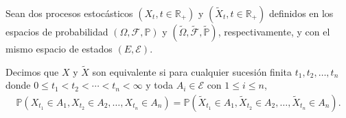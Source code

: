 \begin{definition}
Sean dos procesos estocásticos $(X_t, t \in \mathbb{R}_{+})$ y $(\tilde{X}_t, t \in \mathbb{R}_{+})$ definidos en los espacios de probabilidad $(\Omega, \mathcal{F}, \mathbb{P})$ y $(\tilde{\Omega}, \tilde{\mathcal{F}}, \tilde{\mathbb{P}})$, respectivamente, y con el mismo espacio de estados $(E, \mathcal{E})$.   
  
Decimos que $X$ y $\tilde{X}$ son equivalente si para cualquier sucesión finita $t_1, t_2, \ldots, t_n$ donde $0 \leq t_1 < t_2 < \cdots < t_n < \infty$ y toda $A_i \in \mathcal{E}$ con $1 \leq i \leq n$,
	\begin{align*}
	\mathbb{P} \left( X_{t_1} \in A_1 , X_{t_2} \in A_2, \ldots, X_{t_n} \in A_n \right) = \mathbb{P} \left( \tilde{X}_{t_1} \in A_1, \tilde{X}_{t_2} \in A_2, \ldots, \tilde{X}_{t_n} \in A_n \right).
	\end{align*}
\end{definition}

